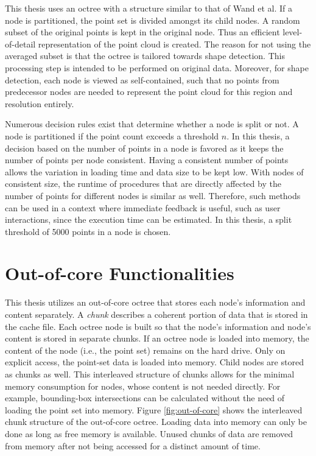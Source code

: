 This thesis uses an octree with a structure similar to that of Wand et al. If a node is partitioned, the point set is divided amongst its child nodes. A random subset of the original points is kept in the original node. Thus an efficient level-of-detail representation of the point cloud is created. 
The reason for not using the averaged subset is that the octree is tailored towards shape detection. This processing step is intended to be performed on original data. Moreover, for shape detection, each node is viewed as self-contained, such that no points from predecessor nodes are needed to represent the point cloud for this region and resolution entirely. 

\par

Numerous decision rules exist that determine whether a node is split or not. A node is partitioned if the point count exceeds a threshold $n$. In this thesis, a decision based on the number of points in a node is favored as it keeps the number of points per node consistent.
Having a consistent number of points allows the variation in loading time and data size to be kept low. With nodes of consistent size, the runtime of procedures that are directly affected by the number of points for different nodes is similar as well. Therefore, such methods can be used in a context where immediate feedback is useful, such as user interactions, since the execution time can be estimated. In this thesis, a split threshold of 5000 points in a node is chosen. 


\section{Out-of-core Functionalities}
\label{sec:octree_ooc}
This thesis utilizes an out-of-core octree that stores each node's information and content separately. A \textit{chunk} describes a coherent portion of data that is stored in the cache file. Each octree node is built so that the node's information and node's content is stored in separate chunks. If an octree node is loaded into memory, the content of the node (i.e., the point set) remains on the hard drive. Only on explicit access, the point-set data is loaded into memory. Child nodes are stored as chunks as well. This interleaved structure of chunks allows for the minimal memory consumption for nodes, whose content is not needed directly. For example, bounding-box intersections can be calculated without the need of loading the point set into memory. Figure \ref{fig:out-of-core} shows the interleaved chunk structure of the out-of-core octree. Loading data into memory can only be done as long as free memory is available. Unused chunks of data are removed from memory after not being accessed for a distinct amount of time.


